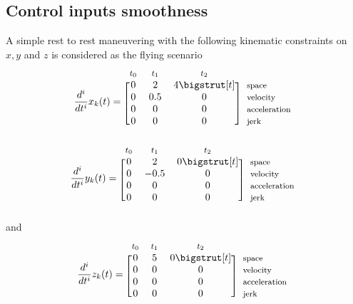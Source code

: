 \subsection{Control inputs smoothness}
A simple rest to rest maneuvering with the following kinematic constraints on $x,y$ and $z$ is considered as the flying scenario
\begin{equation*}
  \dfrac{d^i}{d t^i}x_k(t)=
  \begin{blockarray}{*{3}{c} l}
    \begin{block}{*{3}{>{$\footnotesize}c<{$}} l}
      $t_0$ & $t_1$ & $t_2$ & \\
    \end{block}
    \begin{block}{[*{3}{c}]>{$\footnotesize}l<{$}}
      0 & 2 & 4 \bigstrut[t]& space \\
       0 & 0.5 & 0 & velocity \\
       0 & 0 & 0 & acceleration \\
       0 & 0 & 0 & jerk \\
    \end{block}
  \end{blockarray}
\end{equation*}
\begin{equation*}
  \dfrac{d^i}{d t^i}y_k(t)=
  \begin{blockarray}{*{3}{c} l}
    \begin{block}{*{3}{>{$\footnotesize}c<{$}} l}
      $t_0$ & $t_1$ & $t_2$ & \\
    \end{block}
    \begin{block}{[*{3}{c}]>{$\footnotesize}l<{$}}
      0 & 2 & 0 \bigstrut[t]& space \\
       0 & -0.5 & 0 & velocity \\
       0 & 0 & 0 & acceleration \\
       0 & 0 & 0 & jerk \\
    \end{block}
  \end{blockarray}
\end{equation*}
and
\begin{equation*}
  \dfrac{d^i}{d t^i}z_k(t)=
  \begin{blockarray}{*{3}{c} l}
    \begin{block}{*{3}{>{$\footnotesize}c<{$}} l}
      $t_0$ & $t_1$ & $t_2$ & \\
    \end{block}
    \begin{block}{[*{3}{c}]>{$\footnotesize}l<{$}}
      0 & 5 & 0 \bigstrut[t]& space \\
       0 & 0 & 0 & velocity \\
       0 & 0 & 0 & acceleration \\
       0 & 0 & 0 & jerk \\
    \end{block}
  \end{blockarray}
\end{equation*}

